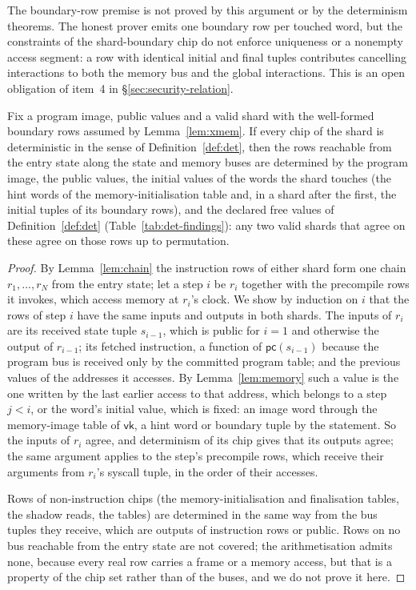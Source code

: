 The boundary-row premise is not proved by this argument or by the determinism theorems. The honest prover emits one boundary row per touched word, but the constraints of the shard-boundary chip do not enforce uniqueness or a nonempty access segment: a row with identical initial and final tuples contributes cancelling interactions to both the memory bus and the global interactions. This is an open obligation of item~4 in \S\ref{sec:security-relation}.

\begin{theorem}
\label{thm:unique}
Fix a program image, public values and a valid shard with the well-formed boundary rows assumed by Lemma~\ref{lem:xmem}. If every chip of the shard is deterministic in the sense of Definition~\ref{def:det}, then the rows reachable from the entry state along the state and memory buses are determined by the program image, the public values, the initial values of the words the shard touches (the hint words of the memory-initialisation table and, in a shard after the first, the initial tuples of its boundary rows), and the declared free values of Definition~\ref{def:det} (Table~\ref{tab:det-findings}): any two valid shards that agree on these agree on those rows up to permutation.
\end{theorem}
\begin{proof}
By Lemma~\ref{lem:chain} the instruction rows of either shard form one chain $r_1, \dots, r_N$ from the entry state; let a step $i$ be $r_i$ together with the precompile rows it invokes, which access memory at $r_i$'s clock. We show by induction on $i$ that the rows of step $i$ have the same inputs and outputs in both shards. The inputs of $r_i$ are its received state tuple $s_{i-1}$, which is public for $i = 1$ and otherwise the output of $r_{i-1}$; its fetched instruction, a function of $\mathsf{pc}(s_{i-1})$ because the program bus is received only by the committed program table; and the previous values of the addresses it accesses. By Lemma~\ref{lem:memory} such a value is the one written by the last earlier access to that address, which belongs to a step $j < i$, or the word's initial value, which is fixed: an image word through the memory-image table of $\mathsf{vk}$, a hint word or boundary tuple by the statement. So the inputs of $r_i$ agree, and determinism of its chip gives that its outputs agree; the same argument applies to the step's precompile rows, which receive their arguments from $r_i$'s syscall tuple, in the order of their accesses.

Rows of non-instruction chips (the memory-initialisation and finalisation tables, the shadow reads, the tables) are determined in the same way from the bus tuples they receive, which are outputs of instruction rows or public. Rows on no bus reachable from the entry state are not covered; the arithmetisation admits none, because every real row carries a frame or a memory access, but that is a property of the chip set rather than of the buses, and we do not prove it here.
\end{proof}

